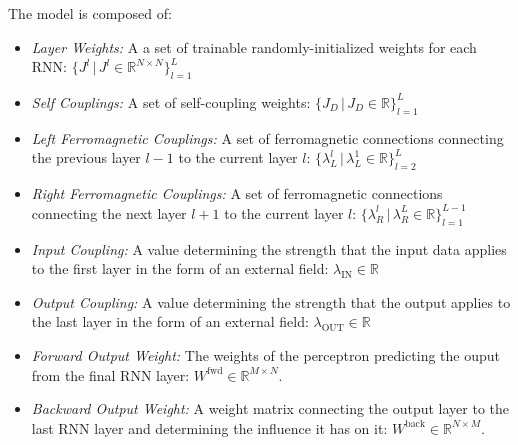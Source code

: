 \documentclass[a4paper,12pt]{report}
\begin{document}
The model is composed of:
\begin{itemize}
    \itemsep-5pt
    \vspace*{-5pt}
    \item \emph{Layer Weights:} A a set of trainable randomly-initialized weights for 
    each RNN:  
    $\{ J^l \hspace{2pt} | \hspace{2pt} J^l \in \mathbb{R}^{N \times N}\}_{l=1}^{L}$
    \item \emph{Self Couplings:} A set of self-coupling weights:
    $\{ J_D \hspace{2pt} | \hspace{2pt} J_D \in \mathbb{R}\}_{l=1}^{L}$
    \item \emph{Left Ferromagnetic Couplings:} A set of ferromagnetic connections 
    connecting the previous layer $l-1$ to the current layer $l$: $ \{ \lambda_L^l 
    \hspace{2pt} | \hspace{2pt} \lambda_L^1 \in \mathbb{R}\}_{l=2}^L$
    \item \emph{Right Ferromagnetic Couplings:} A set of ferromagnetic connections
    connecting the next layer $l+1$ to the current layer $l$: $\{ \lambda_R^l
    \hspace{2pt} | \hspace{2pt} \lambda_R^L \in \mathbb{R}\}_{l=1}^{L-1}$
    \item \emph{Input Coupling:} A value determining the strength that the input data
    applies to the first layer in the form of an external field: $\lambda_{\mathrm{IN}} 
    \in \mathbb{R}$
    \item \emph{Output Coupling:} A value determining the strength that the output
    applies to the last layer in the form of an external field: $\lambda_{\mathrm{OUT}} 
    \in \mathbb{R}$
    \item \emph{Forward Output Weight:}  The weights of the perceptron predicting the 
    ouput from the final RNN layer: $W^{\mathrm{fwd}} \in \mathbb{R}^{M \times N}$.
    \item \emph{Backward Output Weight:} A weight matrix  connecting the output layer to the
    last RNN layer and determining the influence it has on it: $W^{\mathrm{back}} \in \mathbb{R}^{N \times M}$. 
\end{itemize}
\end{document}
